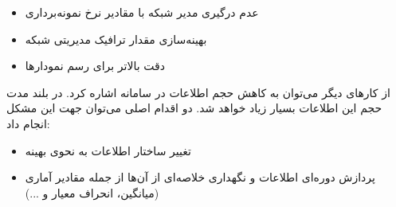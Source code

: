 \begin{itemize}
    \item عدم درگیری مدیر شبکه با مقادیر نرخ نمونه‌برداری
    \item بهینه‌سازی مقدار ترافیک مدیریتی شبکه
    \item دقت بالاتر برای رسم نمودارها
\end{itemize}


از کارهای دیگر می‌توان به کاهش حجم اطلاعات در سامانه اشاره کرد. در بلند مدت حجم این اطلاعات بسیار زیاد خواهد شد. دو اقدام اصلی می‌توان جهت این مشکل انجام داد:

\begin{itemize}
    \item تغییر ساختار اطلاعات به نحوی بهینه
    \item پردازش دوره‌ای اطلاعات و نگهداری خلاصه‌ای از آن‌ها از جمله مقادیر آماری (میانگین، انحراف معیار و ...)
\end{itemize}